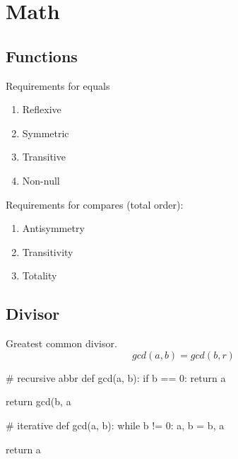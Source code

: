 \chapter{Math}

\section{Functions}
 Requirements for equals
\begin{enumerate}
\item Reflexive
\item Symmetric
\item Transitive
\item Non-null
\end{enumerate}
 Requirements for compares (total order):
\begin{enumerate}
\item Antisymmetry
\item Transitivity
\item Totality
\end{enumerate}
\section{Divisor}
 Greatest common divisor.
$$
gcd(a,b) = gcd(b, r)
$$
\begin{center}
\end{center}

\begin{python}
# recursive abbr
def gcd(a, b):
    if b == 0:
        return a
        
    return gcd(b, a %

# iterative     
def gcd(a, b):
    while b != 0:
        a, b = b, a %

    return a
\end{python}

